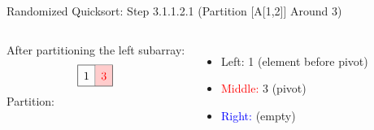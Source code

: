 \begin{frame}{Randomized Quicksort: Step 3.1.1.2.1 (Partition [A[1,2]] Around 3)}
  \begin{columns}[t]
    After partitioning the left subarray:
    \[
      \renewcommand{\arraystretch}{1.5}
      \begin{array}{|c|c|c|}
        \hline
        1 & \cellcolor{red!20}\textcolor{red}{3} \\
        \hline
      \end{array}
    \]
    Partition:
    \begin{itemize}
      \item \textcolor{green!60!black}{Left:} 1 (element before pivot)
      \item \textcolor{red}{Middle:} 3 (pivot)
      \item \textcolor{blue}{Right:} (empty)
    \end{itemize}
    \pause
    \begin{minipage}[t]{\linewidth}
      \vspace{0pt} %
      \begin{center}


\end{center}
\end{minipage}
\end{columns}
\end{frame}
